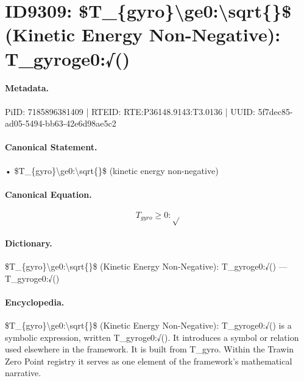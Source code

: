\section*{ID9309: \$T\_\{gyro\}\textbackslash{}ge0:\textbackslash{}sqrt\{\}\$ (Kinetic Energy Non-Negative): T\_gyroge0:√()}
\paragraph{Metadata.}
PiID: 7185896381409 | RTEID: RTE:P36148.9143:T3.0136 | UUID: 5f7dec85-ad05-5494-bb63-42e6d98ae5c2

\paragraph{Canonical Statement.}
• \$T\_\{gyro\}\textbackslash{}ge0:\textbackslash{}sqrt\{\}\$ (kinetic energy non-negative)

\paragraph{Canonical Equation.}
\[
T_{gyro}\ge0:\sqrt{}
\]

\paragraph{Dictionary.}
\$T\_\{gyro\}\textbackslash{}ge0:\textbackslash{}sqrt\{\}\$ (Kinetic Energy Non-Negative): T\_gyroge0:√() — T\_gyroge0:√()

\paragraph{Encyclopedia.}
\$T\_\{gyro\}\textbackslash{}ge0:\textbackslash{}sqrt\{\}\$ (Kinetic Energy Non-Negative): T\_gyroge0:√() is a symbolic expression, written T\_gyroge0:√(). It introduces a symbol or relation used elsewhere in the framework. It is built from T\_gyro. Within the Trawin Zero Point registry it serves as one element of the framework's mathematical narrative.
